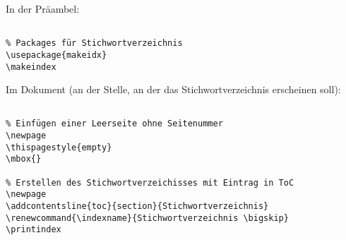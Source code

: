 
In der Präambel:

\begin{verbatim}

% Packages für Stichwortverzeichnis
\usepackage{makeidx}
\makeindex

\end{verbatim}

\tcblower

Im Dokument (an der Stelle, an der das Stichwortverzeichnis erscheinen soll): 

\begin{verbatim}

% Einfügen einer Leerseite ohne Seitenummer
\newpage
\thispagestyle{empty}
\mbox{}

% Erstellen des Stichwortverzeichisses mit Eintrag in ToC
\newpage
\addcontentsline{toc}{section}{Stichwortverzeichnis}
\renewcommand{\indexname}{Stichwortverzeichnis \bigskip}
\printindex


\end{verbatim}
